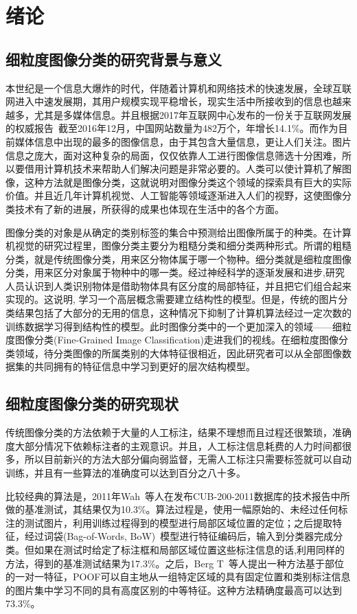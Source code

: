 \chapter{绪论}
\label{cha:xulun}

\section{细粒度图像分类的研究背景与意义}
\label{sec:beijing}
本世纪是一个信息大爆炸的时代，伴随着计算机和网络技术的快速发展，全球互联网进入中速发展期，其用户规模实现平稳增长，现实生活中所接收到的信息也越来越多，尤其是多媒体信息。并且根据2017年互联网中心发布的一份关于互联网发展的权威报告~\cite{jin}截至2016年12月，中国网站数量为482万个，年增长14.1\%。而作为目前媒体信息中出现的最多的图像信息，由于其包含大量信息，更让人们关注。图片信息之庞大，面对这种复杂的局面，仅仅依靠人工进行图像信息筛选十分困难，所以要借用计算机技术来帮助人们解决问题是非常必要的。人类可以使计算机了解图像，这种方法就是图像分类，这就说明对图像分类这个领域的探索具有巨大的实际价值。并且近几年计算机视觉、人工智能等领域逐渐进入人们的视野，这使图像分类技术有了新的进展，所获得的成果也体现在生活中的各个方面。
  
图像分类的对象是从确定的类别标签的集合中预测给出图像所属于的种类。在计算机视觉的研究过程里，图像分类主要分为粗糙分类和细分类两种形式。所谓的粗糙分类，就是传统图像分类，用来区分物体属于哪一个物种。细分类就是细粒度图像分类，用来区分对象属于物种中的哪一类。经过神经科学的逐渐发展和进步,研究人员认识到人类识别物体是借助物体具有区分度的局部特征，并且把它们组合起来实现的。这说明, 学习一个高层概念需要建立结构性的模型。但是，传统的图片分类结果包括了大部分的无用的信息，这种情况下抑制了计算机算法经过一定次数的训练数据学习得到结构性的模型。此时图像分类中的一个更加深入的领域——细粒度图像分类(Fine-Grained Image Classification)走进我们的视线。在细粒度图像分类领域，待分类图像的所属类别的大体特征很相近，因此研究者可以从全部图像数据集的共同拥有的特征信息中学习到更好的层次结构模型。
\section{细粒度图像分类的研究现状}
\label{sec:xianzhuang}
传统图像分类的方法依赖于大量的人工标注，结果不理想而且过程还很繁琐，准确度大部分情况下依赖标注者的主观意识。并且，人工标注信息耗费的人力时间都很多，所以目前新兴的方法大部分偏向弱监督，无需人工标注只需要标签就可以自动训练，并且有一些算法的准确度可以达到百分之八十多。

比较经典的算法是，2011年Wah~\cite{WelinderEtal2010}等人在发布CUB-200-2011数据库的技术报告中所做的基准测试，其结果仅为10.3\%。算法过程是，使用一幅原始的、未经过任何标注的测试图片，利用训练过程得到的模型进行局部区域位置的定位；之后提取特征，经过词袋(Bag-of-Words, BoW)~\cite{harris1954distributional}模型进行特征编码后，输入到分类器完成分类。但如果在测试时给定了标注框和局部区域位置这些标注信息的话,利用同样的方法，得到的基准测试结果为17.3\%。之后，Berg T~\cite{berg2013poof}等人提出一种方法基于部位的一对一特征，POOF可以自主地从一组特定区域的具有固定位置和类别标注信息的图片集中学习不同的具有高度区别的中等特征。这种方法精确度最高可以达到73.3\%。

